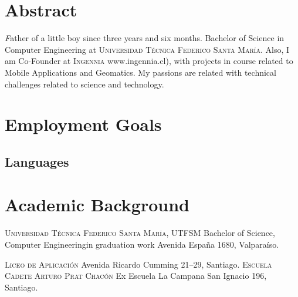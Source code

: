 \documentclass[11pt,letterpaper,roman]{moderncv}
\begin{document}
\maketitle

\section*{\textbf{Abstract}} 
	\textsl Father of a little boy since three years
	and six months. Bachelor of Science in Computer Engineering at
	\textsc{Universidad Técnica Federico Santa María}. Also, I am Co-Founder at
	\textsc{Ingennia} www.ingennia.cl), with projects in course related to Mobile
	Applications and Geomatics. My passions are related with technical challenges
	related to science and technology.
\section{Employment Goals}

\subsection{Languages} 


\section{Academic Background}
	{\textsc{Universidad T\'ecnica Federico Santa Mar\'ia, UTFSM}}
	{Bachelor of Science, Computer Engineering}{in graduation work}
	{}
	{Avenida España 1680, Valparaíso.}

	{\textsc{Liceo de Aplicaci\'on}}
	{}
	{}
	{}
	{Avenida Ricardo Cumming 21--29, Santiago.}
	{\textsc{Escuela Cadete Arturo Prat Chac\'on}}
	{Ex Escuela La Campana}
	{}
	{}
	{San Ignacio 196, Santiago.}
\end{document}
